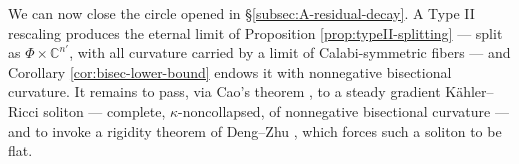 \documentclass[11pt]{amsart}
\theoremstyle{plain}
\numberwithin{equation}{section}
\theoremstyle{definition}
\theoremstyle{remark}
\newtheorem*{remarkx}{Remark}
\begin{document}
	

We can now close the circle opened in \S\ref{subsec:A-residual-decay}. A Type II rescaling produces the eternal limit of Proposition \ref{prop:typeII-splitting} --- split as $\Phi \times \mathbb{C}^{n'}$, with all curvature carried by a limit of Calabi-symmetric fibers --- and Corollary \ref{cor:bisec-lower-bound} endows it with nonnegative bisectional curvature. It remains to pass, via Cao's theorem \cite{Cao97}, to a steady gradient Kähler--Ricci soliton --- complete, $\kappa$-noncollapsed, of nonnegative bisectional curvature --- and to invoke a rigidity theorem of Deng--Zhu \cite{DZ20}, which forces such a soliton to be flat. %
\end{document}
